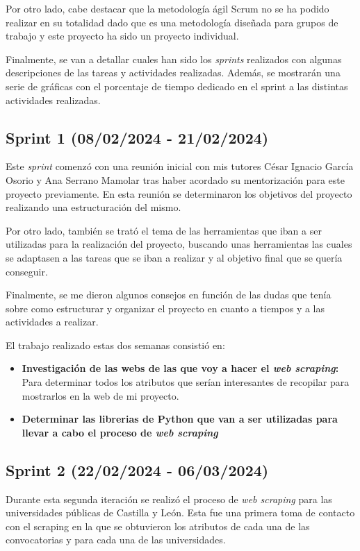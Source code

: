 Por otro lado, cabe destacar que la metodología ágil Scrum no se ha podido realizar en su totalidad dado que es una metodología diseñada para grupos de trabajo y este proyecto ha sido un proyecto individual.

Finalmente, se van a detallar cuales han sido los \textit{sprints} realizados con algunas descripciones de las tareas y actividades realizadas. Además, se mostrarán una serie de gráficas con el porcentaje de tiempo dedicado en el sprint a las distintas actividades realizadas.

\subsection{Sprint 1 (08/02/2024 -
21/02/2024)}

Este \textit{sprint} comenzó con una reunión inicial con mis tutores César Ignacio García Osorio y Ana Serrano Mamolar tras haber acordado su mentorización para este proyecto previamente. En esta reunión se determinaron los objetivos del proyecto realizando una estructuración del mismo.

Por otro lado, también se trató el tema de las herramientas que iban a ser utilizadas para la realización del proyecto, buscando unas herramientas las cuales se adaptasen a las tareas que se iban a realizar y al objetivo final que se quería conseguir. 

Finalmente, se me dieron algunos consejos en función de las dudas que tenía sobre como estructurar y organizar el proyecto en cuanto a tiempos y a las actividades a realizar.


El trabajo realizado estas dos semanas consistió en:
\begin{itemize}
\item 
\textbf{Investigación de las webs de las que voy a hacer el \textit{web scraping}: } Para determinar todos los atributos que serían interesantes de recopilar para mostrarlos en la web de mi proyecto.
\item 
\textbf{Determinar las librerias de Python que van a ser utilizadas para llevar a cabo el proceso de \textit{web scraping} }

\end{itemize}


\subsection{Sprint 2 (22/02/2024 -
06/03/2024)}
Durante esta segunda iteración se realizó el proceso de \textit{web scraping} para las universidades públicas de Castilla y León. Esta fue una primera toma de contacto con el scraping en la que se obtuvieron los atributos de cada una de las convocatorias y para cada una de las universidades.


